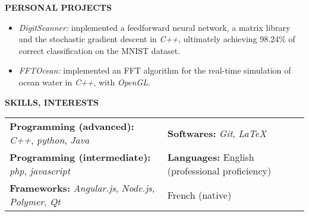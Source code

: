 \documentclass[a4paper, 12pt]{article}
\newcommand{\marginline}{-0.3cm}
\newcommand{\margincontent}{-0.6cm}
\newcommand{\marginbeforemisc}{-0.35cm}
\newcommand{\linewidthperso}{0.02cm}
\begin{document}
\begin{footnotesize}
\textbf{PERSONAL PROJECTS}\\
\vspace{\margincontent}
\begin{itemize}
  \item \textit{DigitScanner:} implemented a feedforward neural network, a matrix library and the stochastic gradient descent in \textit{C++}, ultimately achieving 98.24\% of correct classification on the MNIST dataset.
  \item \textit{FFTOcean:} implemented an FFT algorithm for the real-time simulation of ocean water in \textit{C++}, with \textit{OpenGL}.
\end{itemize}

%

\textbf{SKILLS, INTERESTS}
\vspace{\marginline}\\
\noindent\makebox[\linewidth]{\rule{\textwidth}{\linewidthperso}}
\vspace{\marginbeforemisc}

\noindent\begin{tabular}{@{}p{9cm}p{8cm}}
  \textbf{Programming (advanced):} \textit{C++}, \textit{python}, \textit{Java} & \textbf{Softwares:} \textit{Git}, \textit{LaTeX}\\
  \textbf{Programming (intermediate):} \textit{php}, \textit{javascript} & \textbf{Languages:} English (professional proficiency)\\
  \textbf{Frameworks:} \textit{Angular.js}, \textit{Node.js}, \textit{Polymer}, \textit{Qt} & \hspace{2cm} French (native)
\end{tabular}


\end{footnotesize}
\end{document}
